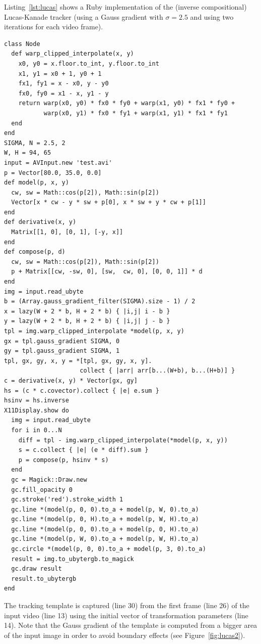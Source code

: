 \documentclass[12pt,a4paper,oneside,openright]{book}
\newcommand{\fig}[1]{Figure~\ref{fig:#1}}
\newcommand{\lst}[1]{Listing~\ref{lst:#1}}
\begin{document}
\begin{CJK}{UTF8}{}
\lst{lucas} shows a Ruby implementation of the (inverse compositional) Lucas-Kanade tracker (using a Gauss gradient with $\sigma=2.5$ and using two iterations for each video frame).
\lstset{language=Ruby,frame=single,numbers=left}
\begin{lstlisting}[float,caption={Lucas-Kanade tracker},escapechar=\$,label=lst:lucas]
class Node
  def warp_clipped_interpolate(x, y)
    x0, y0 = x.floor.to_int, y.floor.to_int
    x1, y1 = x0 + 1, y0 + 1
    fx1, fy1 = x - x0, y - y0
    fx0, fy0 = x1 - x, y1 - y
    return warp(x0, y0) * fx0 * fy0 + warp(x1, y0) * fx1 * fy0 +
           warp(x0, y1) * fx0 * fy1 + warp(x1, y1) * fx1 * fy1
  end
end
SIGMA, N = 2.5, 2
W, H = 94, 65
input = AVInput.new 'test.avi'
p = Vector[80.0, 35.0, 0.0]
def model(p, x, y)
  cw, sw = Math::cos(p[2]), Math::sin(p[2])
  Vector[x * cw - y * sw + p[0], x * sw + y * cw + p[1]]
end
def derivative(x, y)
  Matrix[[1, 0], [0, 1], [-y, x]]
end
def compose(p, d)
  cw, sw = Math::cos(p[2]), Math::sin(p[2])
  p + Matrix[[cw, -sw, 0], [sw,  cw, 0], [0, 0, 1]] * d
end
img = input.read_ubyte
b = (Array.gauss_gradient_filter(SIGMA).size - 1) / 2
x = lazy(W + 2 * b, H + 2 * b) { |i,j| i - b }
y = lazy(W + 2 * b, H + 2 * b) { |i,j| j - b }
tpl = img.warp_clipped_interpolate *model(p, x, y)
gx = tpl.gauss_gradient SIGMA, 0
gy = tpl.gauss_gradient SIGMA, 1
tpl, gx, gy, x, y = *[tpl, gx, gy, x, y].
                     collect { |arr| arr[b...(W+b), b...(H+b)] }
c = derivative(x, y) * Vector[gx, gy]
hs = (c * c.covector).collect { |e| e.sum }
hsinv = hs.inverse
X11Display.show do
  img = input.read_ubyte
  for i in 0...N
    diff = tpl - img.warp_clipped_interpolate(*model(p, x, y))
    s = c.collect { |e| (e * diff).sum }
    p = compose(p, hsinv * s)
  end
  gc = Magick::Draw.new
  gc.fill_opacity 0
  gc.stroke('red').stroke_width 1
  gc.line *(model(p, 0, 0).to_a + model(p, W, 0).to_a)
  gc.line *(model(p, 0, H).to_a + model(p, W, H).to_a)
  gc.line *(model(p, 0, 0).to_a + model(p, 0, H).to_a)
  gc.line *(model(p, W, 0).to_a + model(p, W, H).to_a)
  gc.circle *(model(p, 0, 0).to_a + model(p, 3, 0).to_a)
  result = img.to_ubytergb.to_magick
  gc.draw result
  result.to_ubytergb
end
\end{lstlisting}
The tracking template is captured (line 30) from the first frame (line 26) of the input video (line 13) using the initial vector of transformation parameters (line 14). Note that the Gauss gradient of the template is computed from a bigger area of the input image in order to avoid boundary effects (see \fig{lucas2}).
\begin{figure}[htbp]

\end{figure}
\end{CJK}
\end{document}
